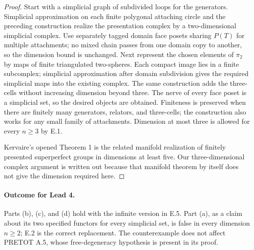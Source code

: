 \begin{proof}
Start with a simplicial graph of subdivided loops for the
generators. Simplicial approximation on each finite polygonal
attaching circle and the preceding construction realize the
presentation complex by a two-dimensional simplicial complex.
Use separately tagged domain face posets sharing $P(T)$ for
multiple attachments; no mixed chain passes from one domain
copy to another, so the dimension bound is unchanged. Next
represent the chosen elements of $\pi_2$ by maps of finite
triangulated two-spheres. Each compact image lies in a finite
subcomplex; simplicial approximation after domain subdivision
gives the required simplicial maps into the existing complex.
The same construction adds the three-cells without increasing
dimension beyond three. The nerve of every face poset is a
simplicial set, so the desired objects are obtained. Finiteness
is preserved when there are finitely many generators, relators,
and three-cells; the construction also works for any small
family of attachments. Dimension at most three is allowed for
every $n\geq3$ by E.1.

Kervaire's opened Theorem 1 \citep{Kervaire1969} is the related
manifold realization of finitely presented superperfect groups
in dimensions at least five. Our three-dimensional complex
argument is written out because that manifold theorem by itself
does not give the dimension required here.
\end{proof}

\paragraph{Outcome for Lead 4.}
Parts (b), (c), and (d) hold with the infinite version in E.5.
Part (a), as a claim about its two specified functors for every
simplicial set, is false in every dimension $n\geq2$; E.2 is the
correct replacement. The counterexample does not affect PRETOT
A.5, whose free-degeneracy hypothesis is present in its proof.

